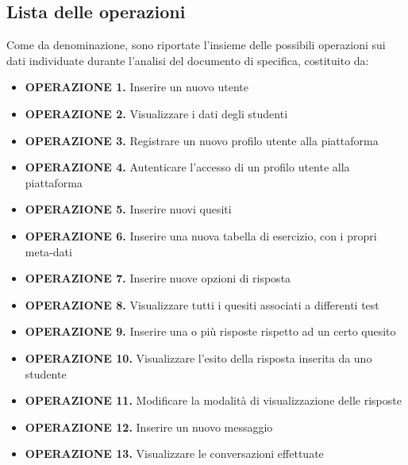 \documentclass{article}
\begin{document}
\subsection{Lista delle operazioni}
\large
Come da denominazione, sono riportate l'insieme delle possibili operazioni sui dati individuate durante l'analisi del documento di specifica, costituito da: 
\begin{itemize}[label={ }]
    \itemsep1px
    \item {\small\bf{OPERAZIONE 1.}} \hspace*{1px} Inserire un nuovo utente
    \item {\small\bf{OPERAZIONE 2.}} \hspace*{1px} Visualizzare i dati degli studenti 
    \item {\small\bf{OPERAZIONE 3.}} \hspace*{1px} Registrare un nuovo profilo utente alla piattaforma 
    \item {\small\bf{OPERAZIONE 4.}} \hspace*{1px} Autenticare l'accesso di un profilo utente alla piattaforma
    \item {\small\bf{OPERAZIONE 5.}} \hspace*{1px} Inserire nuovi quesiti 
    \item {\small\bf{OPERAZIONE 6.}} \hspace*{1px} Inserire una nuova tabella di esercizio, con i propri meta-dati 
    \item {\small\bf{OPERAZIONE 7.}} \hspace*{1px} Inserire nuove opzioni di risposta
    \item {\small\bf{OPERAZIONE 8.}} \hspace*{1px} Visualizzare tutti i quesiti associati a differenti test 
    \item {\small\bf{OPERAZIONE 9.}} \hspace*{1px} Inserire una o più risposte rispetto ad un certo quesito 
    \item {\small\bf{OPERAZIONE 10.}} Visualizzare l'esito della risposta inserita da uno studente
    \item {\small\bf{OPERAZIONE 11.}} Modificare la modalità di visualizzazione delle risposte
    \item {\small\bf{OPERAZIONE 12.}} Inserire un nuovo messaggio 
    \item {\small\bf{OPERAZIONE 13.}} Visualizzare le conversazioni effettuate
\end{itemize}
\end{document}
